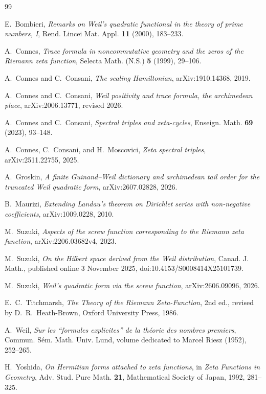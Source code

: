\documentclass[11pt]{article}
\begin{document}
\begin{thebibliography}{99}

E.~Bombieri,
\emph{Remarks on Weil's quadratic functional in the theory of prime numbers, I},
Rend. Lincei Mat. Appl. \textbf{11} (2000), 183--233.

A.~Connes,
\emph{Trace formula in noncommutative geometry and the zeros of the Riemann zeta function},
Selecta Math. (N.S.) \textbf{5} (1999), 29--106.

A.~Connes and C.~Consani,
\emph{The scaling Hamiltonian},
arXiv:1910.14368, 2019.

A.~Connes and C.~Consani,
\emph{Weil positivity and trace formula, the archimedean place},
arXiv:2006.13771, revised 2026.

A.~Connes and C.~Consani,
\emph{Spectral triples and zeta-cycles},
Enseign. Math. \textbf{69} (2023), 93--148.

A.~Connes, C.~Consani, and H.~Moscovici,
\emph{Zeta spectral triples},
arXiv:2511.22755, 2025.

A.~Groskin,
\emph{A finite Guinand--Weil dictionary and archimedean tail order for the truncated Weil
quadratic form},
arXiv:2607.02828, 2026.

B.~Maurizi,
\emph{Extending Landau's theorem on Dirichlet series with non-negative coefficients},
arXiv:1009.0228, 2010.

M.~Suzuki,
\emph{Aspects of the screw function corresponding to the Riemann zeta function},
arXiv:2206.03682v4, 2023.

M.~Suzuki,
\emph{On the Hilbert space derived from the Weil distribution},
Canad. J. Math., published online 3 November 2025,
doi:10.4153/S0008414X25101739.

M.~Suzuki,
\emph{Weil's quadratic form via the screw function},
arXiv:2606.09096, 2026.

E.~C.~Titchmarsh,
\emph{The Theory of the Riemann Zeta-Function}, 2nd ed., revised by D.~R.~Heath-Brown,
Oxford University Press, 1986.

A.~Weil,
\emph{Sur les ``formules explicites'' de la th\'eorie des nombres premiers},
Commun. S\'em. Math. Univ. Lund, volume dedicated to Marcel Riesz (1952), 252--265.

H.~Yoshida,
\emph{On Hermitian forms attached to zeta functions},
in \emph{Zeta Functions in Geometry}, Adv. Stud. Pure Math. \textbf{21},
Mathematical Society of Japan, 1992, 281--325.

\end{thebibliography}
\end{document}
